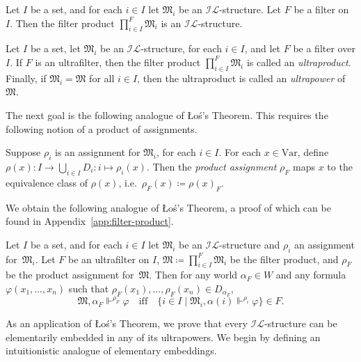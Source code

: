 \documentclass[submission,copyright,creativecommons]{eptcs}
\newcommand{\mo}{\mathfrak}
\renewcommand{\phi}{\varphi}
\renewcommand{\iff}{\quad\text{iff}\quad}
\newcommand{\Var}{\mathrm{Var}}
\newcommand{\IL}{\mathscr{I\!\!L}}   %
\newcommand{\satisfySym}{\Vdash}
\newcommand{\satisfy}[4]{#1, #2 \satisfySym^{#4} #3}
\begin{document}
\begin{proposition}\label{prop:filter-product}
  Let $I$ be a set, and for each $i \in I$ let $\mo{M}_i$ be an
  $\IL$-structure. Let $F$ be a filter on $I$.
  Then the filter product $\prod_{i \in I}^F \mo{M}_i$ is an $\IL$-structure.
\end{proposition}

\begin{definition}
  Let $I$ be a set, let $\mo{M}_i$ be an $\IL$-structure, for each $i \in I$, and let $F$ be a filter over $I$.
  If $F$ is an ultrafilter, then the filter product $\prod_{i \in I}^F \mo{M}_i$ is called an
  \emph{ultraproduct}.
  Finally, if $\mo{M}_i = \mo{M}$ for all $i \in I$,
  then the ultraproduct is called an \emph{ultrapower} of $\mo{M}$. 
\end{definition}

  The next goal is the following analogue of {\L}o{\'s}'s Theorem.
  This requires the following notion of a product of assignments.

\begin{definition}\label{def:prod-assignment}
  Suppose $\rho_i$ is an assignment for $\mo{M}_i$, for each $i \in I$.
  For each $x \in \Var$, define
  $\rho(x) : I \to \bigcup_{i \in I} D_i : i \mapsto \rho_i(x)$.
  Then the \emph{product assignment} $\rho_F$
  maps $x$ to the equivalence class of $\rho(x)$,
  i.e.~$\rho_F(x) \coloneq \rho(x)_F$.
\end{definition}

  We obtain the following analogue of {\L}o{\'s}'s Theorem,
  a proof of which can be found in Appendix~\ref{app:filter-product}.

\begin{theorem}\label{thm:Los}
  Let $I$ be a set, and for each $i \in I$ let $\mo{M}_i$ be an $\IL$-structure
  and $\rho_i$ an assignment for~$\mo{M}_i$.
  Let $F$ be an ultrafilter on $I$,
  $\mo{M} \coloneq \prod_{i \in I}^F \mo{M}_i$ be the filter product,
  and $\rho_F$ be
  the product assignment for~$\mo{M}$.
  Then for any world $\alpha_F \in W$ and any formula $\phi(x_1, \ldots, x_n)$
  such that $\rho_F(x_1), \ldots, \rho_F(x_n) \in D_{\alpha_F}$,
  \begin{equation*}
    \satisfy{\mo{M}}{\alpha_F}{\phi}{\rho_F}
      \iff \{ i \in I \mid \satisfy{\mo{M}_i}{\alpha(i)}{\phi}{\rho_i} \} \in F.
  \end{equation*}
\end{theorem}

  As an application of {\L}o{\'s}'s Theorem, we prove that every $\IL$-structure
  can be elementarily embedded in any of its ultrapowers.
  We begin by defining an intuitionistic analogue of elementary embeddings.
\end{document}
